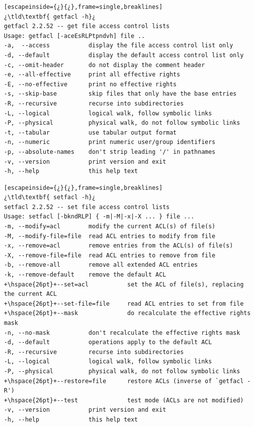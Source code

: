 \begin{lstlisting}[escapeinside={¿}{¿},frame=single,breaklines]
¿\tld\textbf{ getfacl -h}¿
getfacl 2.2.52 -- get file access control lists
Usage: getfacl [-aceEsRLPtpndvh] file ..
-a,  --access           display the file access control list only
-d, --default           display the default access control list only
-c, --omit-header       do not display the comment header
-e, --all-effective     print all effective rights
-E, --no-effective      print no effective rights
-s, --skip-base         skip files that only have the base entries
-R, --recursive         recurse into subdirectories
-L, --logical           logical walk, follow symbolic links
-P, --physical          physical walk, do not follow symbolic links
-t, --tabular           use tabular output format
-n, --numeric           print numeric user/group identifiers
-p, --absolute-names    don't strip leading '/' in pathnames
-v, --version           print version and exit
-h, --help              this help text
\end{lstlisting}

\begin{lstlisting}[escapeinside={¿}{¿},frame=single,breaklines]
¿\tld\textbf{ setfacl -h}¿
setfacl 2.2.52 -- set file access control lists
Usage: setfacl [-bkndRLP] { -m|-M|-x|-X ... } file ...
-m, --modify=acl        modify the current ACL(s) of file(s)
-M, --modify-file=file  read ACL entries to modify from file
-x, --remove=acl        remove entries from the ACL(s) of file(s)
-X, --remove-file=file  read ACL entries to remove from file
-b, --remove-all        remove all extended ACL entries
-k, --remove-default    remove the default ACL
+\hspace{26pt}+--set=acl           set the ACL of file(s), replacing the current ACL
+\hspace{26pt}+--set-file=file     read ACL entries to set from file
+\hspace{26pt}+--mask              do recalculate the effective rights mask
-n, --no-mask           don't recalculate the effective rights mask
-d, --default           operations apply to the default ACL
-R, --recursive         recurse into subdirectories
-L, --logical           logical walk, follow symbolic links
-P, --physical          physical walk, do not follow symbolic links
+\hspace{26pt}+--restore=file      restore ACLs (inverse of `getfacl -R')
+\hspace{26pt}+--test              test mode (ACLs are not modified)
-v, --version           print version and exit
-h, --help              this help text
\end{lstlisting}

